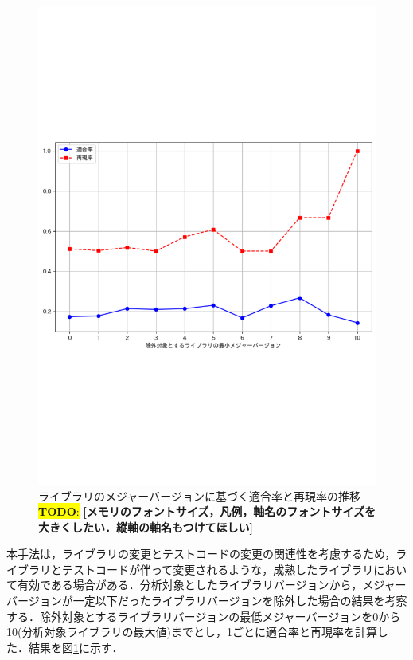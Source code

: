 \documentclass[submit]{ipsj}
\newcommand{\todo}[1]{\colorbox{yellow}{{\bf TODO}:}{\color{red} {\textbf{[#1]}}}}
\begin{document}
\begin{figure}[t]
  \centering
  \includegraphics[width=1.0\linewidth]{IPSJjournal_maekawa_fig/tuikabunseki.pdf}
  \caption{ライブラリのメジャーバージョンに基づく適合率と再現率の推移\todo{メモリのフォントサイズ，凡例，軸名のフォントサイズを大きくしたい．縦軸の軸名もつけてほしい}}
  \label{fig:tuikabunseki}
  \vspace{-10mm}
\end{figure}

本手法は，ライブラリの変更とテストコードの変更の関連性を考慮するため，ライブラリとテストコードが伴って変更されるような，成熟したライブラリにおいて有効である場合がある．分析対象としたライブラリバージョンから，メジャーバージョンが一定以下だったライブラリバージョンを除外した場合の結果を考察する．除外対象とするライブラリバージョンの最低メジャーバージョンを0から10(分析対象ライブラリの最大値)までとし，1ごとに適合率と再現率を計算した．結果を図\ref{fig:tuikabunseki}に示す．
\end{document}

